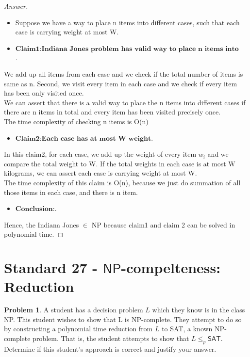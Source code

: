 \documentclass[11pt]{article}
\theoremstyle{definition}
\theoremstyle{definition}
\newtheorem{required}{Problem}
\theoremstyle{definition}
\begin{document}
\begin{proof}[Answer]
\begin{itemize}
\item Suppose we have a way to place n items into different cases, such that each case is carrying weight at most W. 
\end{itemize}
\begin{itemize}
\item$\textbf{Claim1:Indiana Jones problem has valid way to place n items into different cases}$.
\end{itemize}

We add up all items from each case and we check if the total number of items is same as n. Second, we visit every item in each case and we check if every item has been only visited once.\\
We can assert that there is a valid way to place the n items into different cases if there are n items in total and every item has been visited precisely once.\\
The time complexity of checking n items is O(n)
\begin{itemize}
\item$\textbf{Claim2:Each case has at most W weight}$.
\end{itemize}

In this claim2, for each case, we add up the weight of every item $w_i$ and we compare the total weight to W. If the total weights in each case is at most W kilograms, we can assert each case is carrying weight at most W.\\
The time complexity of this claim is O(n), because we just do summation of all those items in each case, and there is n item.

\begin{itemize}
\item$\textbf{Conclusion:}$.
\end{itemize}
Hence, the Indiana Jones $\in$ NP because claim1 and claim 2 can be solved in polynomial time.
\end{proof}

\newpage
\section{Standard 27 - $\textsf{NP}$-compelteness: Reduction}
\begin{required} \label{S30Prob1}
A student has a decision problem $L$ which they know is in the class \textsf{NP}. This student wishes to show that L is \textsf{NP}-complete. They attempt to do so by constructing a polynomial time reduction from $L$ to \textsf{SAT}, a known \textsf{NP}-complete problem. That is, the student attempts to show that $L \leq_{p} \textsf{SAT}.$ Determine if this student’s approach is
correct and justify your answer.
\end{required}
\end{document}
